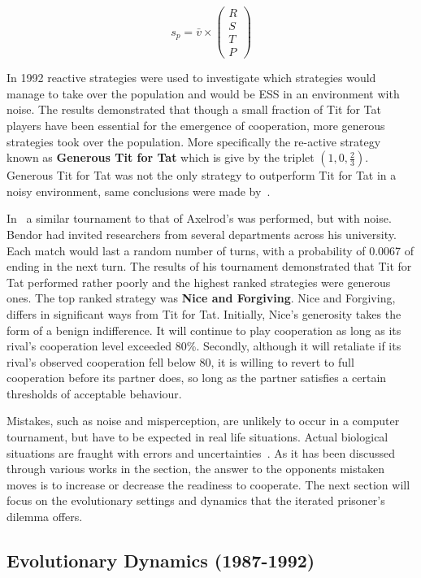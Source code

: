 \documentclass{article}
\theoremstyle{definition}
\begin{document}
\[s_p = \bar{v} \times \begin{pmatrix} R \\ S \\ T \\ P \end{pmatrix}\]

In 1992 reactive strategies were used
to investigate which strategies would manage to take over
the population and would be ESS in an environment with noise. The results demonstrated that 
though a small fraction of Tit for Tat players have been essential for the emergence
of cooperation, more generous strategies took over the population. More specifically
the re-active strategy known as \textbf{Generous Tit for Tat} which is give by
the triplet \((1, 0, \frac{2}{3})\). Generous Tit for Tat was not the only strategy
to outperform Tit for Tat in a noisy environment, same conclusions were made
by~\cite{Godfray1992, Bendor1991}.

In~\cite{Bendor1991} a similar tournament to that of Axelrod's was performed,
but with noise. Bendor had invited researchers from several
departments across his university. Each match would last a random number of turns,
with a probability of 0.0067 of ending in the next turn. The results of his
tournament demonstrated that Tit for Tat performed rather poorly and the highest
ranked strategies were generous ones. The top ranked strategy was
\textbf{Nice and Forgiving}. Nice and Forgiving, differs in significant ways
from Tit for Tat. Initially, Nice's generosity takes the form of a benign indifference.
It will continue to play cooperation as long as its rival's cooperation level
exceeded 80\%. Secondly, although it will retaliate if its rival's observed cooperation fell
below 80, it is willing to revert to full cooperation before its partner does,
so long as the partner satisfies a certain thresholds of acceptable behaviour.

Mistakes, such as noise and misperception, are unlikely to occur in a computer
tournament, but have to be expected in real life situations. Actual biological
situations are fraught with errors and uncertainties~\cite{Milinski1987}.
As it has been discussed through various works in the section, the answer to the
opponents mistaken moves is to increase or decrease the readiness to cooperate.
The next section will focus on the evolutionary settings and dynamics that the
iterated prisoner's dilemma offers.

\subsection{Evolutionary Dynamics (1987-1992)}\label{section:evolutionary_dynamics}
\end{document}
